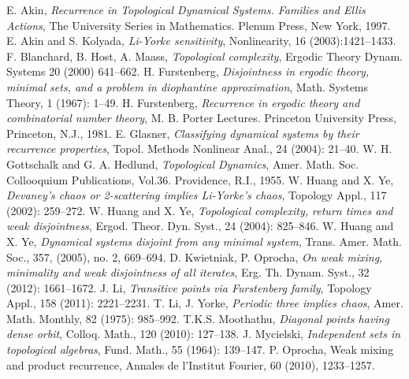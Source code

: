 \documentclass[12pt,a4paper]{amsart}
\theoremstyle{definition}
\numberwithin{equation}{section}
\begin{document}
\begin{thebibliography}{MM}
 E. Akin, \textit{Recurrence in Topological Dynamical Systems.
Families and Ellis Actions}, The University Series in Mathematics. Plenum Press, New York, 1997.
 E. Akin and S. Kolyada, \textit{Li-Yorke sensitivity}, Nonlinearity, 16 (2003):1421--1433.
 F. Blanchard, B. Host, A. Maass, \textit{Topological complexity},
Ergodic Theory Dynam. Systems 20 (2000) 641--662.
H. Furstenberg, \textit{Disjointness in ergodic theory,  minimal sets,  and a problem in diophantine
approximation},  Math. Systems Theory,  1 (1967): 1--49.
 H. Furstenberg, \textit{Recurrence in ergodic theory and combinatorial number theory},
M. B. Porter Lectures. Princeton University Press, Princeton, N.J., 1981.
 E. Glasner, \textit{Classifying dynamical systems by their recurrence properties},
Topol. Methods Nonlinear Anal., 24 (2004): 21--40.
 W. H. Gottschalk and G. A. Hedlund, \textit{Topological Dynamics},
Amer. Math. Soc. Collooquium Publications, Vol.36. Providence, R.I., 1955.
W. Huang and X. Ye, \textit{Devaney's chaos or 2-scattering implies Li-Yorke's chaos},
 Topology Appl., 117 (2002): 259--272.
 W. Huang and X. Ye, \textit{Topological complexity, return times and weak disjointness},
Ergod. Theor. Dyn. Syst., 24 (2004): 825--846.
 W. Huang and X. Ye, \textit{Dynamical systems disjoint from any minimal system},
Trans. Amer. Math. Soc., 357, (2005), no. 2, 669--694.
D. Kwietniak, P. Oprocha, \textit{On weak mixing, minimality and weak disjointness of
all iterates},  Erg. Th. Dynam. Syst., 32 (2012): 1661--1672.
J. Li, \textit{Transitive points via Furstenberg family}, Topology Appl., 158 (2011): 2221--2231.
 T. Li, J. Yorke,  \textit{Periodic three implies chaos},
Amer. Math. Monthly, 82 (1975): 985--992.
T.K.S. Moothathu, \textit{Diagonal points having dense orbit},
Colloq. Math., 120 (2010): 127--138.
 J. Mycielski, \textit{Independent sets in topological algebras}, Fund. Math., 55 (1964): 139--147.
 P. Oprocha, Weak mixing and product recurrence, Annales de l'Institut Fourier, 60 (2010), 1233--1257.
\end{thebibliography}
\end{document}
